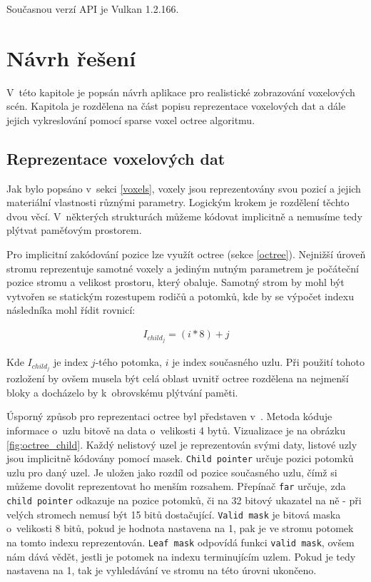 Současnou verzí API je Vulkan 1.2.166\cite{vulkanspec}.

\chapter{Návrh řešení}
\label{navrh}
V~této kapitole je popsán návrh aplikace pro realistické zobrazování voxelových scén. Kapitola je rozdělena na část popisu reprezentace voxelových dat a dále jejich vykreslování pomocí sparse voxel octree algoritmu.

\section{Reprezentace voxelových dat}
Jak bylo popsáno v~sekci \ref{voxels}, voxely jsou reprezentovány svou pozicí a jejich materiální vlastnosti různými parametry. Logickým krokem je rozdělení těchto dvou věcí. V~některých strukturách můžeme kódovat implicitně a nemusíme tedy plýtvat paměťovým prostorem.

Pro implicitní zakódování pozice lze využít octree (sekce \ref{octree}). Nejnižší úroveň stromu reprezentuje samotné voxely a jediným nutným parametrem je počáteční pozice stromu a velikost prostoru, který obaluje. Samotný strom by mohl být vytvořen se statickým rozestupem rodičů a potomků, kde by se výpočet indexu následníka mohl řídit rovnicí:

\begin{equation} \label{eq:simple_octree_index}
	\begin{gathered}
		I_{child_j} = (i * 8) + j
	\end{gathered}
\end{equation}

Kde $I_{child_j}$ je index $j$-tého potomka, $i$ je index současného uzlu. Při použití tohoto rozložení by ovšem musela být celá oblast uvnitř octree rozdělena na nejmenší bloky a docházelo by k~obrovskému plýtvání paměti.

Úsporný způsob pro reprezentaci octree byl představen v~\cite{Laine2011EfficientSV}. Metoda kóduje informace o~uzlu bitově na data o~velikosti 4 bytů. Vizualizace je na obrázku \ref{fig:octree_child}. Každý nelistový uzel je reprezentován svými daty, listové uzly jsou implicitně kódovány pomocí masek. \texttt{Child pointer} určuje pozici potomků uzlu pro daný uzel. Je uložen jako rozdíl od pozice současného uzlu, čímž si můžeme dovolit reprezentovat ho menším rozsahem. Přepínač \texttt{far} určuje, zda \texttt{child pointer} odkazuje na pozice potomků, či na 32 bitový ukazatel na ně - při velých stromech nemusí být 15 bitů dostačující. \texttt{Valid mask} je bitová maska o~velikosti 8 bitů, pokud je hodnota nastavena na 1, pak je ve stromu potomek na tomto indexu reprezentován. \texttt{Leaf mask} odpovídá funkci \texttt{valid mask}, ovšem nám dává vědět, jestli je potomek na indexu terminujícím uzlem. Pokud je tedy nastavena na 1, tak je vyhledávání ve stromu na této úrovni ukončeno.

